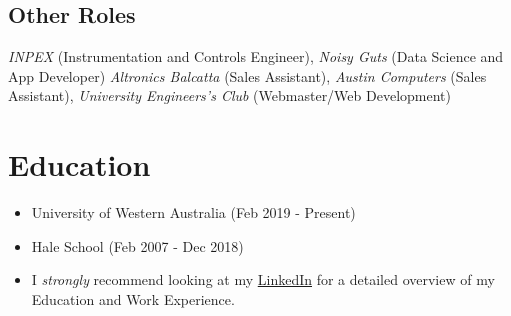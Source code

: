 \documentclass{article}[a4page]
\begin{document}
\subsection*{Other Roles}
\emph{INPEX} (Instrumentation and Controls Engineer), \emph{Noisy Guts} (Data Science and App Developer) \emph{Altronics Balcatta} (Sales Assistant), \emph{Austin Computers} (Sales Assistant), \emph{University Engineers’s Club} (Webmaster/Web Development)

\section*{Education}
\begin{itemize}
    \item University of Western Australia \hfill (Feb 2019 - Present)
    \item Hale School \hfill (Feb 2007 - Dec 2018)
    \item I \emph{strongly} recommend looking at my \href{https://www.linkedin.com/in/henry-chen-21b672176/}{LinkedIn} for a detailed overview of my Education and Work Experience.
\end{itemize}
\end{document}
